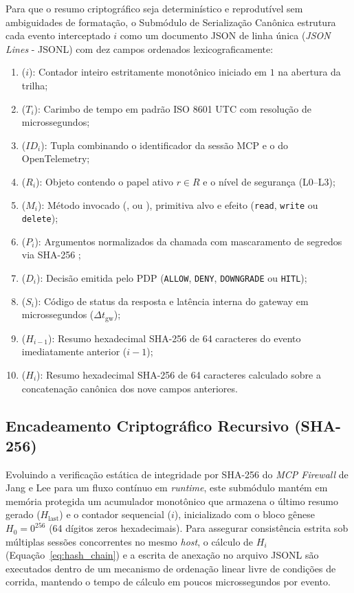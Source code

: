 Para que o resumo criptográfico seja determinístico e reprodutível sem ambiguidades de formatação, o Submódulo de Serialização Canônica estrutura cada evento interceptado $i$ como um documento JSON de linha única (\textit{JSON Lines} - JSONL) com dez campos ordenados lexicograficamente:
\begin{enumerate}
  \item {} ($i$): Contador inteiro estritamente monotônico iniciado em $1$ na abertura da trilha;
  \item {} ($T_i$): Carimbo de tempo em padrão ISO 8601 UTC com resolução de microssegundos;
  \item {} ($ID_i$): Tupla combinando o identificador da sessão MCP e o  do OpenTelemetry;
  \item {} ($R_i$): Objeto contendo o papel ativo $r \in R$ e o nível de segurança (L0--L3);
  \item {} ($M_i$): Método invocado (,  ou ), primitiva alvo e efeito (\texttt{read}, \texttt{write} ou \texttt{delete});
  \item {} ($P_i$): Argumentos normalizados da chamada com mascaramento de segredos via SHA-256 \cite{hasan2026mcp,hou2025mcp};
  \item {} ($D_i$): Decisão emitida pelo PDP (\texttt{ALLOW}, \texttt{DENY}, \texttt{DOWNGRADE} ou \texttt{HITL});
  \item {} ($S_i$): Código de status da resposta e latência interna do gateway em microssegundos ($\Delta t_{\text{gw}}$);
  \item {} ($H_{i-1}$): Resumo hexadecimal SHA-256 de 64 caracteres do evento imediatamente anterior ($i-1$);
  \item {} ($H_i$): Resumo hexadecimal SHA-256 de 64 caracteres calculado sobre a concatenação canônica dos nove campos anteriores.
\end{enumerate}

\subsection{Encadeamento Criptográfico Recursivo (SHA-256)}
\label{subsec:encadeamento_sha256}

Evoluindo a verificação estática de integridade por SHA-256 do \textit{MCP Firewall} de Jang e Lee \cite{jang2026hierarchical} para um fluxo contínuo em \textit{runtime}, este submódulo mantém em memória protegida um acumulador monotônico que armazena o último resumo gerado ($H_{\text{last}}$) e o contador sequencial ($i$), inicializado com o bloco gênese $H_0 = 0^{256}$ (64 dígitos zeros hexadecimais). Para assegurar consistência estrita sob múltiplas sessões concorrentes no mesmo \textit{host}, o cálculo de $H_i$ (Equação~\ref{eq:hash_chain}) e a escrita de anexação no arquivo JSONL são executados dentro de um mecanismo de ordenação linear livre de condições de corrida, mantendo o tempo de cálculo em poucos microssegundos por evento.

